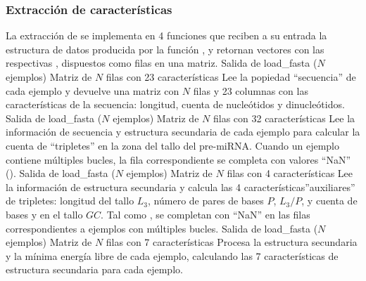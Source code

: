 %
\subsubsection{Extracción de características}
%
La extracción de  se implementa en 4 funciones que reciben a
su entrada la estructura de datos producida por la función
, y retornan vectores con las respectivas
, dispuestos como filas en una matriz.
%
          {Salida de load\_fasta ($N$ ejemplos)}
          {Matriz de $N$ filas con 23 características}
          {Lee la popiedad ``secuencia'' de cada ejemplo y devuelve
            una matriz con $N$ filas y 23 columnas con las
            características de la secuencia: longitud, cuenta de
            nucleótidos y dinucleótidos.}
%
           {Salida de load\_fasta ($N$ ejemplos)}
           {Matriz de $N$ filas con 32 características}
           {Lee la información de secuencia y estructura secundaria de
             cada ejemplo para calcular la cuenta de ``tripletes'' en
             la zona del tallo del pre-miRNA. Cuando un ejemplo
             contiene múltiples bucles, la fila correspondiente se
             completa con valores ``NaN'' ().}
%
           {Salida de load\_fasta ($N$ ejemplos)}
           {Matriz de $N$ filas con 4 características}
           {Lee la información de estructura secundaria y calcula las
             4 características''auxiliares'' de tripletes: longitud
             del tallo $L_3$, número de pares de bases $P$, $L_3/P$, y
             cuenta de bases \ntG{} y \ntC{} en el tallo $GC$.  Tal como
             , se completan con ``NaN'' en las
             filas correspondientes a ejemplos con múltiples bucles.}
%
           {Salida de load\_fasta ($N$ ejemplos)}
           {Matriz de $N$ filas con 7 características}
           {Procesa la estructura secundaria y la mínima energía libre
             de cada ejemplo, calculando las 7 características de
             estructura secundaria para cada ejemplo.}
%
